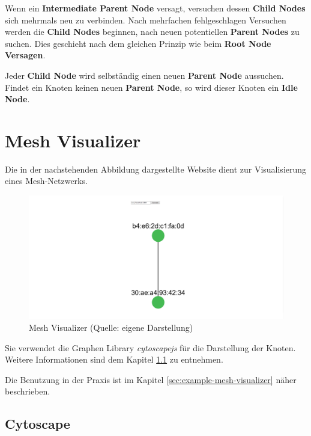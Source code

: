 \begin{itemize}
    Wenn ein \textbf{Intermediate Parent Node} versagt, versuchen dessen \textbf{Child Nodes} sich mehrmals neu zu verbinden. Nach mehrfachen fehlgeschlagen Versuchen werden die \textbf{Child Nodes} beginnen, nach neuen potentiellen \textbf{Parent Nodes} zu suchen. Dies geschieht nach dem gleichen Prinzip wie beim \textbf{Root Node Versagen}.

    Jeder \textbf{Child Node} wird selbständig einen neuen \textbf{Parent Node} aussuchen. Findet ein Knoten keinen neuen \textbf{Parent Node}, so wird dieser Knoten ein \textbf{Idle Node}.
\end{itemize}

\pagebreak

\section{Mesh Visualizer}\label{sec:mesh-visualizer}

Die in der nachstehenden Abbildung dargestellte Website dient zur Visualisierung eines Mesh-Netzwerks. 

\begin{figure}[H] \begin{center}
        \includegraphics[scale=0.3]{images/example_result_mesh_visualizer.png}
        \caption{Mesh Visualizer (Quelle: eigene Darstellung)}
        \label{abb:mesh_visualizer}
    \end{center}    
\end{figure}

Sie verwendet die Graphen Library \textit{cytoscapejs} für die Darstellung der Knoten. Weitere Informationen sind dem Kapitel \ref{sec:cytoscape} zu entnehmen. 

Die Benutzung in der Praxis ist im Kapitel \ref{sec:example-mesh-visualizer} näher beschrieben.

\subsection{Cytoscape}\label{sec:cytoscape}

